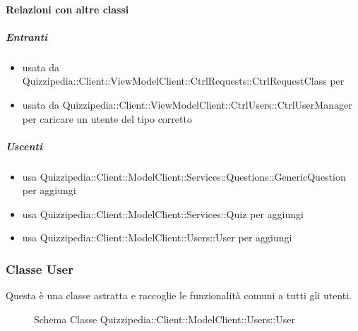 \paragraph{Relazioni con altre classi}
\subparagraph{Entranti}
\begin{itemize}
\item usata da Quizzipedia::Client::ViewModelClient::CtrlRequests::CtrlRequestClass per 
\item usata da Quizzipedia::Client::ViewModelClient::CtrlUsers::CtrlUserManager per caricare un utente del tipo corretto
\end{itemize}
\subparagraph{Uscenti}
\begin{itemize}
\item usa Quizzipedia::Client::ModelClient::Services::Questions::GenericQuestion per aggiungi
\item usa Quizzipedia::Client::ModelClient::Services::Quiz per aggiungi
\item usa Quizzipedia::Client::ModelClient::Users::User per aggiungi
\end{itemize}
\subsubsection{Classe User}
Questa è una classe astratta e raccoglie le funzionalità comuni a tutti gli utenti.
\begin{figure}[H]
\centering
\noindent{}
\caption[Schema Classe User]{Schema Classe Quizzipedia::Client::ModelClient::Users::User}
\end{figure}
